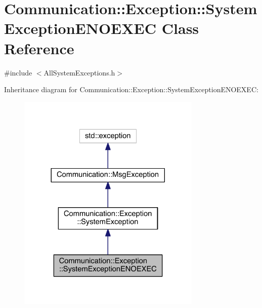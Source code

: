 \hypertarget{class_communication_1_1_exception_1_1_system_exception_e_n_o_e_x_e_c}{}\section{Communication\+:\+:Exception\+:\+:System\+Exception\+E\+N\+O\+E\+X\+E\+C Class Reference}
\label{class_communication_1_1_exception_1_1_system_exception_e_n_o_e_x_e_c}


{\ttfamily \#include $<$All\+System\+Exceptions.\+h$>$}



Inheritance diagram for Communication\+:\+:Exception\+:\+:System\+Exception\+E\+N\+O\+E\+X\+E\+C\+:\nopagebreak
\begin{figure}[H]
\begin{center}
\leavevmode
\includegraphics[width=248pt]{class_communication_1_1_exception_1_1_system_exception_e_n_o_e_x_e_c__inherit__graph}
\end{center}
\end{figure}



